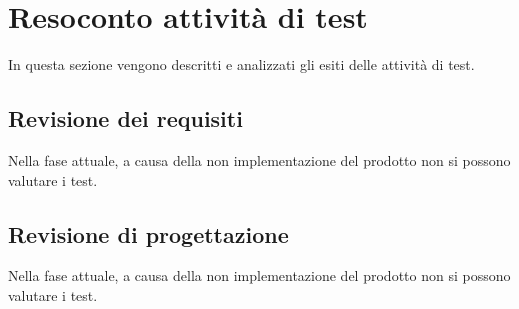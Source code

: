 \section{Resoconto attività di test}
In questa sezione vengono descritti e analizzati gli esiti delle attività
di test.

\subsection{Revisione dei requisiti}

Nella fase attuale, a causa della non implementazione del prodotto non si possono valutare i test.

\newpage

\subsection{Revisione di progettazione}

Nella fase attuale, a causa della non implementazione del prodotto non si possono valutare i test.